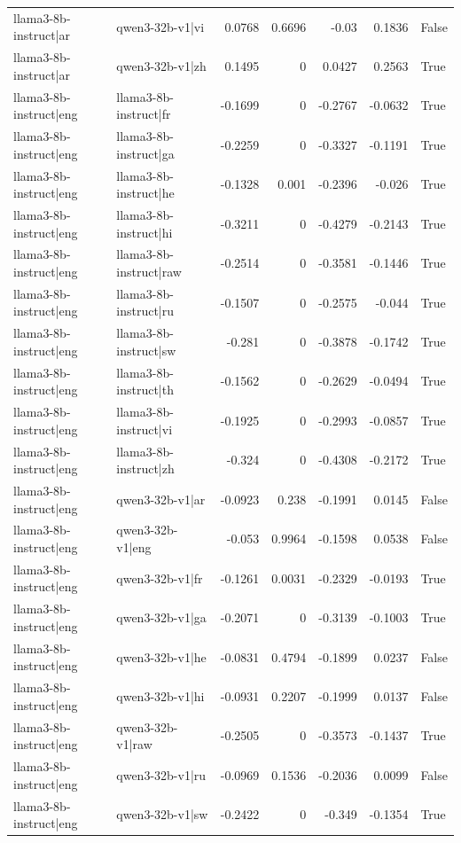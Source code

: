\begin{table}
\begin{tabular}{l l r r r r l}
llama3-8b-instruct|ar & qwen3-32b-v1|vi & 0.0768 & 0.6696 & -0.03 & 0.1836 & False \\
llama3-8b-instruct|ar & qwen3-32b-v1|zh & 0.1495 & 0 & 0.0427 & 0.2563 & True \\
llama3-8b-instruct|eng & llama3-8b-instruct|fr & -0.1699 & 0 & -0.2767 & -0.0632 & True \\
llama3-8b-instruct|eng & llama3-8b-instruct|ga & -0.2259 & 0 & -0.3327 & -0.1191 & True \\
llama3-8b-instruct|eng & llama3-8b-instruct|he & -0.1328 & 0.001 & -0.2396 & -0.026 & True \\
llama3-8b-instruct|eng & llama3-8b-instruct|hi & -0.3211 & 0 & -0.4279 & -0.2143 & True \\
llama3-8b-instruct|eng & llama3-8b-instruct|raw & -0.2514 & 0 & -0.3581 & -0.1446 & True \\
llama3-8b-instruct|eng & llama3-8b-instruct|ru & -0.1507 & 0 & -0.2575 & -0.044 & True \\
llama3-8b-instruct|eng & llama3-8b-instruct|sw & -0.281 & 0 & -0.3878 & -0.1742 & True \\
llama3-8b-instruct|eng & llama3-8b-instruct|th & -0.1562 & 0 & -0.2629 & -0.0494 & True \\
llama3-8b-instruct|eng & llama3-8b-instruct|vi & -0.1925 & 0 & -0.2993 & -0.0857 & True \\
llama3-8b-instruct|eng & llama3-8b-instruct|zh & -0.324 & 0 & -0.4308 & -0.2172 & True \\
llama3-8b-instruct|eng & qwen3-32b-v1|ar & -0.0923 & 0.238 & -0.1991 & 0.0145 & False \\
llama3-8b-instruct|eng & qwen3-32b-v1|eng & -0.053 & 0.9964 & -0.1598 & 0.0538 & False \\
llama3-8b-instruct|eng & qwen3-32b-v1|fr & -0.1261 & 0.0031 & -0.2329 & -0.0193 & True \\
llama3-8b-instruct|eng & qwen3-32b-v1|ga & -0.2071 & 0 & -0.3139 & -0.1003 & True \\
llama3-8b-instruct|eng & qwen3-32b-v1|he & -0.0831 & 0.4794 & -0.1899 & 0.0237 & False \\
llama3-8b-instruct|eng & qwen3-32b-v1|hi & -0.0931 & 0.2207 & -0.1999 & 0.0137 & False \\
llama3-8b-instruct|eng & qwen3-32b-v1|raw & -0.2505 & 0 & -0.3573 & -0.1437 & True \\
llama3-8b-instruct|eng & qwen3-32b-v1|ru & -0.0969 & 0.1536 & -0.2036 & 0.0099 & False \\
llama3-8b-instruct|eng & qwen3-32b-v1|sw & -0.2422 & 0 & -0.349 & -0.1354 & True \\

\end{tabular}
\end{table}
